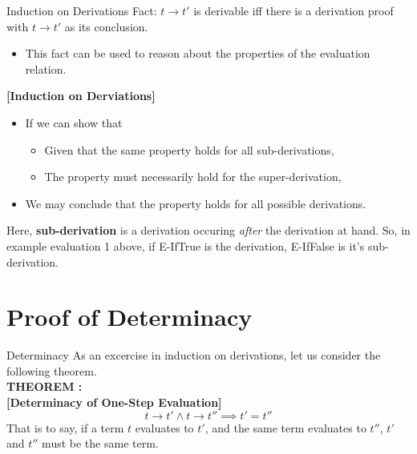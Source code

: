 \documentclass[11pt]{beamer}
\begin{document}
\begin{frame}[fragile=singleslide]{Induction on Derivations}
Fact: $t \rightarrow t'$ is derivable iff there is a derivation proof with $t \rightarrow t'$ as its conclusion.  
\begin{itemize}
\item This fact can be used to reason about the properties of the evaluation relation.  
\end{itemize}
\textbf{[Induction on Derviations]}
\begin{itemize}
\item If we can show that
\begin{itemize}
\item Given that the same property holds for all sub-derivations,
\item The property must necessarily hold for the super-derivation,
\end{itemize}
\item We may conclude that the property holds for all possible derivations.  
\end{itemize}
Here, \textbf{sub-derivation} is a derivation occuring \emph{after} the derivation at hand.  So, in example evaluation 1 above, if E-IfTrue is the derivation, E-IfFalse is it's sub-derivation.  
\end{frame}

\section[Determinacy]{Proof of Determinacy}
\begin{frame}[fragile=singleslide]{Determinacy}
As an excercise in induction on derivations, let us consider the following theorem. \\
\vspace{1em}
\textbf{THEOREM :} \\
\textbf{[Determinacy of One-Step Evaluation]}  \\
\begin{equation}
t \rightarrow t' \land t \rightarrow t'' \implies t' = t''
\end{equation}
That is to say, if a term $t$ evaluates to $t'$, and the same term evaluates to $t''$, $t'$ and $t''$ must be the same term.  
\end{frame}
\end{document}
